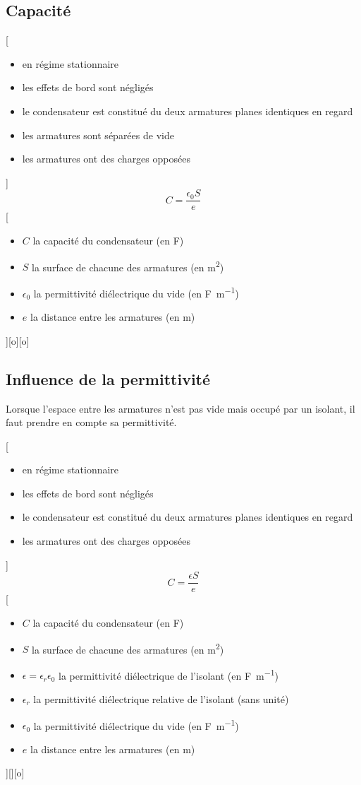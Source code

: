 \subsection{Capacité}

[
    \begin{itemize}
        \item en régime stationnaire
        \item les effets de bord sont négligés
        \item le condensateur est constitué du deux armatures planes identiques en regard
        \item les armatures sont séparées de vide
        \item les armatures ont des charges opposées
    \end{itemize}
]
{$$C=\frac{\epsilon_0S}{e}$$}
[
    \begin{itemize}
        \item $C$ la capacité du condensateur (en \unit{F})
        \item $S$ la surface de chacune des armatures (en \unit{m^2})
        \item $\epsilon_0$ la permittivité diélectrique du vide (en \unit{F.m^{-1}})
        \item $e$ la distance entre les armatures (en \unit{m})
    \end{itemize}
][o][o]

\subsection{Influence de la permittivité}

Lorsque l'espace entre les armatures n'est pas vide mais occupé par un isolant, il faut prendre en compte sa permittivité.

[
    \begin{itemize}
        \item en régime stationnaire
        \item les effets de bord sont négligés
        \item le condensateur est constitué du deux armatures planes identiques en regard
        \item les armatures ont des charges opposées
    \end{itemize}
    \schema{}{3cm}
]
{$$C=\frac{\epsilon S}{e}$$}
[
    \begin{itemize}
        \item $C$ la capacité du condensateur (en \unit{F})
        \item $S$ la surface de chacune des armatures (en \unit{m^2})
        \item $\epsilon=\epsilon_r\epsilon_0$ la permittivité diélectrique de l'isolant (en \unit{F.m^{-1}})
        \item $\epsilon_r$ la permittivité diélectrique relative de l'isolant (sans unité)
        \item $\epsilon_0$ la permittivité diélectrique du vide (en \unit{F.m^{-1}})
        \item $e$ la distance entre les armatures (en \unit{m})
    \end{itemize}
][][o]

